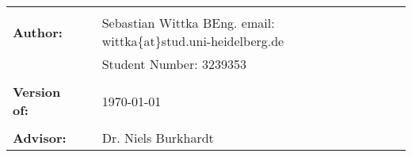 





\vfil

\begin{flushleft}
\begin{tabular}{llll}
& & \\
\textbf{Author:} & & Sebastian Wittka BEng. email:
wittka\{at\}stud.uni-heidelberg.de&
\\
& & Student Number: 3239353 & \\
& & \\
\textbf{Version of:} & & \today &\\
& & \\
\textbf{Advisor:} & & Dr. Niels Burkhardt &\\
\end{tabular}
\end{flushleft}
